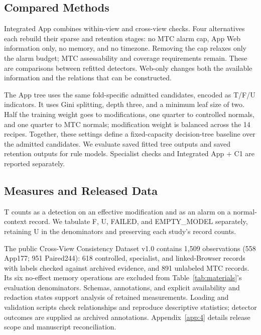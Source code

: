 \hypertarget{sec:4-2}{%
\subsection{Compared Methods}\label{sec:4-2}}

Integrated App combines within-view and cross-view checks. Four alternatives each rebuild their sparse and retention stages: no MTC alarm cap, App Web information only, no memory, and no timezone. Removing the cap relaxes only the alarm budget; MTC assessability and coverage requirements remain. These are comparisons between refitted detectors. Web-only changes both the available information and the relations that can be constructed.

The App tree uses the same fold-specific admitted candidates, encoded as T/F/U indicators. It uses Gini splitting, depth three, and a minimum leaf size of two. Half the training weight goes to modifications, one quarter to controlled normals, and one quarter to MTC normals; modification weight is balanced across the 14 recipes. Together, these settings define a fixed-capacity decision-tree baseline over the admitted candidates. We evaluate saved fitted tree outputs and saved retention outputs for rule models. Specialist checks and Integrated App + C1 are reported separately.

\hypertarget{sec:4-3}{%
\subsection{Measures and Released Data}\label{sec:4-3}}

T counts as a detection on an effective modification and as an alarm on a normal-context record. We tabulate F, U, FAILED, and EMPTY\_\allowbreak{}MODEL separately, retaining U in the denominators and preserving each study's record counts.

The public Cross-View Consistency Dataset v1.0 contains 1,509 observations (558 App177; 951 Paired244): 618 controlled, specialist, and linked-Browser records with labels checked against archived evidence, and 891 unlabeled MTC records. Its six no-effect memory operations are excluded from Table~\ref{tab:materials}'s evaluation denominators. Schemas, annotations, and explicit availability and redaction states support analysis of retained measurements. Loading and validation scripts check relationships and reproduce descriptive statistics; detector outcomes are supplied as archived annotations. Appendix~\ref{app:4} details release scope and manuscript reconciliation.


